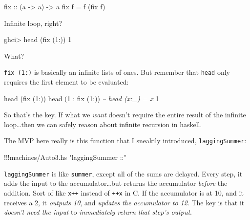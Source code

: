 \documentclass[]{article}
\newenvironment{Shaded}{}{}
\newcommand{\DecValTok}[1]{\textcolor[rgb]{0.25,0.63,0.44}{{#1}}}
\newcommand{\StringTok}[1]{\textcolor[rgb]{0.25,0.44,0.63}{{#1}}}
\newcommand{\CommentTok}[1]{\textcolor[rgb]{0.38,0.63,0.69}{\textit{{#1}}}}
\newcommand{\OtherTok}[1]{\textcolor[rgb]{0.00,0.44,0.13}{{#1}}}
\newcommand{\FunctionTok}[1]{\textcolor[rgb]{0.02,0.16,0.49}{{#1}}}
\newcommand{\NormalTok}[1]{{#1}}
\begin{document}
\begin{Shaded}
\begin{Highlighting}[]
\OtherTok{fix ::} \NormalTok{(a }\OtherTok{->} \NormalTok{a) }\OtherTok{->} \NormalTok{a}
\NormalTok{fix f }\FunctionTok{=} \NormalTok{f (fix f)}
\end{Highlighting}
\end{Shaded}

Infinite loop, right?

\begin{Shaded}
\begin{Highlighting}[]
\NormalTok{ghci}\FunctionTok{>} \NormalTok{head (fix (}\DecValTok{1}\FunctionTok{:}\NormalTok{))}
\DecValTok{1}
\end{Highlighting}
\end{Shaded}

What?

\texttt{fix\ (1:)} is basically an infinite lists of ones. But remember
that \texttt{head} only requires the first element to be evaluated:

\begin{Shaded}
\begin{Highlighting}[]
\NormalTok{head (fix (}\DecValTok{1}\FunctionTok{:}\NormalTok{))}
\NormalTok{head (}\DecValTok{1} \FunctionTok{:} \NormalTok{fix (}\DecValTok{1}\FunctionTok{:}\NormalTok{))     }\CommentTok{-- head (x:_) = x}
\DecValTok{1}
\end{Highlighting}
\end{Shaded}

So that's the key. If what we \emph{want} doesn't require the entire
result of the infinite loop\ldots{}then we can safely reason about
infinite recursion in haskell.

The MVP here really is this function that I sneakily introduced,
\texttt{laggingSummer}:

\begin{Shaded}
\begin{Highlighting}[]
\FunctionTok{!!!}\NormalTok{machines}\FunctionTok{/}\NormalTok{Auto3.hs }\StringTok{"laggingSummer ::"}
\end{Highlighting}
\end{Shaded}

\texttt{laggingSummer} is like \texttt{summer}, except all of the sums
are delayed. Every step, it adds the input to the accumulator\ldots{}but
returns the accumulator \emph{before} the addition. Sort of like
\texttt{x++} instead of \texttt{++x} in C. If the accumulator is at 10,
and it receives a 2, it \emph{outputs 10}, and \emph{updates the
accumulator to 12}. The key is that it \emph{doesn't need the input} to
\emph{immediately return that step's output}.
\end{document}
